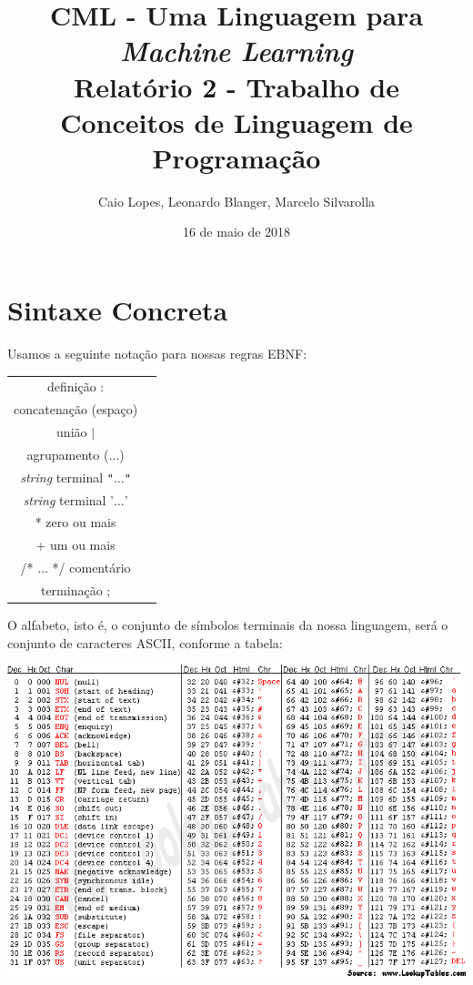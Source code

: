 \documentclass[12pt]{article}
\title{CML - Uma Linguagem para {\it Machine Learning} \\ \Large Relatório 2 - Trabalho de Conceitos de Linguagem de Programação}
\author{Caio Lopes, Leonardo Blanger, Marcelo Silvarolla}
\date{16 de maio de 2018}
\begin{document}
\lstset{
  basicstyle=\ttfamily,
  columns=fullflexible,
  keepspaces=true,
  mathescape
}

\maketitle
\tableofcontents
\newpage
\section{Sintaxe Concreta}
Usamos a seguinte notação para nossas regras EBNF:
\begin{center}
\begin{tabular}{c c}
definição  : \\
concatenação  (espaço) \\
união  $\vert$  \\
agrupamento  ($\ldots$) \\
{\it string} terminal  \verb!"!$\ldots$\verb!"! \\
{\it string} terminal  '$\ldots$' \\
*  zero ou mais \\
+  um ou mais \\
/* $\ldots$ */  comentário \\
terminação  ;
\end{tabular}
\end{center}

O alfabeto, isto é, o conjunto de símbolos terminais da nossa linguagem, será o conjunto de caracteres ASCII, conforme a tabela:
\begin{center}
\includegraphics[width=\linewidth,height=\textheight,keepaspectratio]{asciitable.png}
\end{center}
\end{document}
